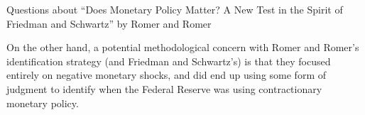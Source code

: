 \documentclass[10pt]{extarticle}
\begin{document}
{\begin{problem}{Questions about ``Does Monetary Policy Matter? A New Test in the Spirit of Friedman and Schwartz'' by Romer and Romer}
\begin{tcolorbox}[colback = white, title = (d), breakable]
      On the other hand, a potential methodological concern with Romer and Romer's identification strategy (and Friedman and Schwartz's) is that they focused entirely on negative monetary shocks, and did end up using some form of judgment to identify when the Federal Reserve was using contractionary monetary policy.
    \end{tcolorbox}
    \begin{tcolorbox}[colback = white, title = (e), breakable]
      \begin{center}
\end{center}
\end{tcolorbox}
\end{problem}}
\end{document}
